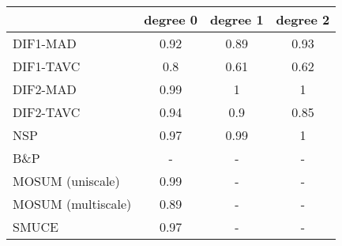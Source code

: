 \begin{tabular}{|l|c|c|c|}
  \hline
 & degree 0 & degree 1 & degree 2 \\ 
  \hline
DIF1-MAD & 0.92 & 0.89 & 0.93 \\ 
  DIF1-TAVC & 0.8 & 0.61 & 0.62 \\ 
  DIF2-MAD & 0.99 & 1 & 1 \\ 
  DIF2-TAVC & 0.94 & 0.9 & 0.85 \\ 
  NSP & 0.97 & 0.99 & 1 \\ 
  B\&P & - & - & - \\ 
  MOSUM (uniscale) & 0.99 & - & - \\ 
  MOSUM (multiscale) & 0.89 & - & - \\ 
  SMUCE & 0.97 & - & - \\ 
   \hline
\end{tabular}
